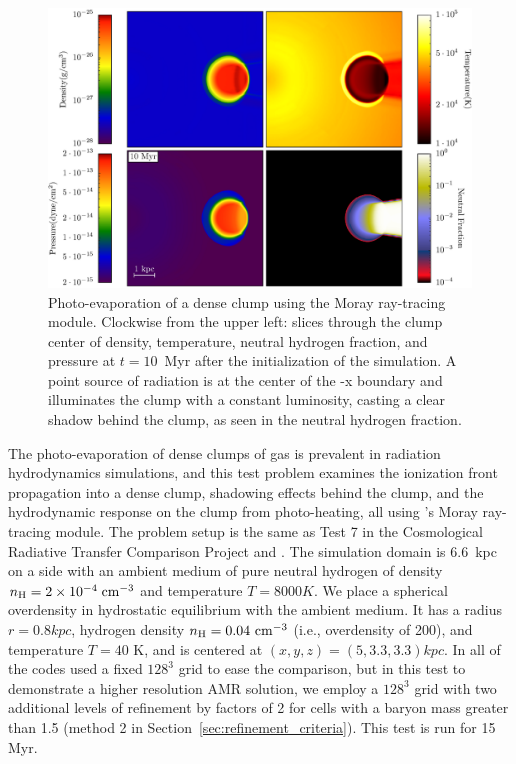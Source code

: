 \begin{figure}
  \centering
  \includegraphics[width=1.0\textwidth]{figures/shadowing-slices.eps}
  \caption{Photo-evaporation of a dense clump using the Moray
ray-tracing module.  Clockwise from the upper left: slices
through the clump center of density, temperature, neutral hydrogen
fraction, and pressure at $t=10$~Myr after the initialization of the
simulation.  A point source of radiation is at the center of the -x
boundary and illuminates the clump with a constant luminosity, casting
a clear shadow behind the clump, as seen in the neutral hydrogen
fraction.}
  \label{fig:shadowing2}
\end{figure}

The photo-evaporation of dense clumps of gas is prevalent in radiation
hydrodynamics simulations, and this test problem examines the
ionization front propagation into a dense clump, shadowing effects
behind the clump, and the hydrodynamic response on the clump from
photo-heating, all using \enzo's Moray ray-tracing module.  The
problem setup is the same as Test 7 in the Cosmological Radiative
Transfer Comparison Project \citep{IlievEtAl2009} and
\citet{Wise11_Moray}.  The simulation domain is 6.6~kpc on a side with
an ambient medium of pure neutral hydrogen of density $n_{\rm H} = 2
\times 10^{-4}\; \cubecm$ and temperature $T = 8000 \unit{K}$.  We
place a spherical overdensity in hydrostatic equilibrium with the
ambient medium.  It has a radius $r = 0.8 \unit{kpc}$, hydrogen
density $n_{\rm H} = 0.04\ \cubecm$ (i.e., overdensity of 200), and
temperature $T = 40$ K, and is centered at $(x,y,z) = (5, 3.3, 3.3)
\unit{kpc}$.  In \citet{IlievEtAl2009} all of the codes used a fixed
$128^3$ grid to ease the comparison, but in this test to demonstrate a
higher resolution AMR solution, we employ a $128^3$ grid with two
additional levels of refinement by factors of 2 for cells with a
baryon mass greater than 1.5 (method 2 in
Section~\ref{sec:refinement_criteria}). This test is run for 15 Myr.

